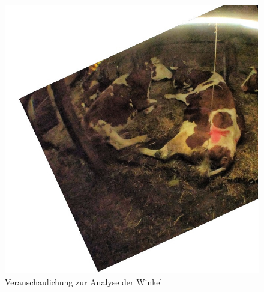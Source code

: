 \begin{figure}[H]
	\center
	\includegraphics[scale=1.3]{Grafiken/entwicklung/21AngleCorrecturDemonstration.jpg}
	\caption{Veranschaulichung zur Analyse der Winkel} 
	\label{fig: Veranschaulichung zur Analyse der Winkel} 
\end{figure}


